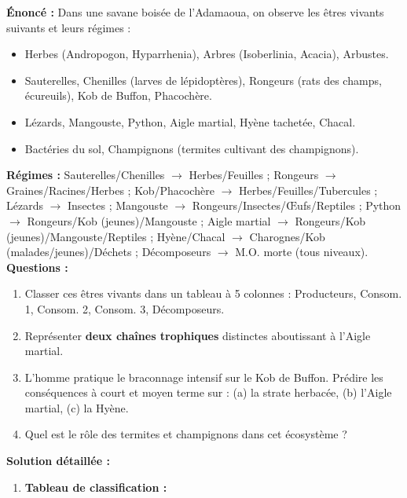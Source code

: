 \documentclass[11pt]{article}
\begin{document}
\begin{exoresolu}
    \textbf{Énoncé :} Dans une savane boisée de l'Adamaoua, on observe les êtres vivants suivants et leurs régimes :
    \begin{itemize}
        \item Herbes (Andropogon, Hyparrhenia), Arbres (Isoberlinia, Acacia), Arbustes.
        \item Sauterelles, Chenilles (larves de lépidoptères), Rongeurs (rats des champs, écureuils), Kob de Buffon, Phacochère.
        \item Lézards, Mangouste, Python, Aigle martial, Hyène tachetée, Chacal.
        \item Bactéries du sol, Champignons (termites cultivant des champignons).
    \end{itemize}
    \textbf{Régimes :} Sauterelles/Chenilles $\rightarrow$ Herbes/Feuilles ; Rongeurs $\rightarrow$ Graines/Racines/Herbes ; Kob/Phacochère $\rightarrow$ Herbes/Feuilles/Tubercules ; Lézards $\rightarrow$ Insectes ; Mangouste $\rightarrow$ Rongeurs/Insectes/Œufs/Reptiles ; Python $\rightarrow$ Rongeurs/Kob (jeunes)/Mangouste ; Aigle martial $\rightarrow$ Rongeurs/Kob (jeunes)/Mangouste/Reptiles ; Hyène/Chacal $\rightarrow$ Charognes/Kob (malades/jeunes)/Déchets ; Décomposeurs $\rightarrow$ M.O. morte (tous niveaux).
    \textbf{Questions :}
    \begin{enumerate}
        \item Classer ces êtres vivants dans un tableau à 5 colonnes : Producteurs, Consom. 1, Consom. 2, Consom. 3, Décomposeurs.
        \item Représenter \textbf{deux chaînes trophiques} distinctes aboutissant à l'Aigle martial.
        \item L'homme pratique le braconnage intensif sur le Kob de Buffon. Prédire les conséquences à court et moyen terme sur : (a) la strate herbacée, (b) l'Aigle martial, (c) la Hyène.
        \item Quel est le rôle des termites et champignons dans cet écosystème ?
    \end{enumerate}
    \tcblower
    \textbf{Solution détaillée :}
    \begin{enumerate}
        \item \textbf{Tableau de classification :}
        \begin{center}
        \begin{tabularx}{\linewidth}{|l|X|X|X|X|X|}\hline

\end{tabularx}
\end{center}
\end{enumerate}
\end{exoresolu}
\end{document}
